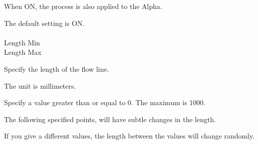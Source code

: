 \documentclass[a4paper,12pt]{article}
\begin{document}
When ON, the process is also applied to the Alpha.\par
The default setting is ON.\\
\\
Length Min\\
Length Max\par
Specify the length of the flow line.\par
The unit is millimeters.\par
Specify a value greater than or equal to 0. The maximum is 1000.\par
The following specified points, will have subtle changes in the length.\par
If you give a different values, the length between the values will change randomly.

\newpage

\thispagestyle{empty}
\end{document}

